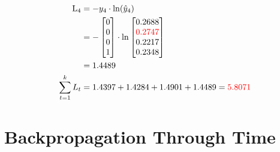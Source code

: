 \documentclass{article}
\begin{document}
\begin{align*}
    \text{L}_{4} & = -y_4 \cdot \ln(\hat{y}_4) \\
    &=-\begin{bmatrix} 0 \\ 0 \\ 0 \\ 1 \end{bmatrix} \cdot \ln{\begin{bmatrix} 0.2688 \\ \textcolor{red}{0.2747} \\ 0.2217 \\ 0.2348 \end{bmatrix}} \\
    &=1.4489 \\
    \sum_{t=1}^k L_t & = 1.4397 + 1.4284 + 1.4901 + 1.4489 = \textcolor{red}{5.8071}
\end{align*}

\section{Backpropagation Through Time}
\end{document}
